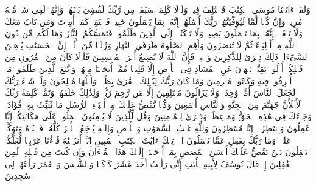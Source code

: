 \stopbuffer
\startbuffer[\q:11:110]
وَلَقَدۡ ءَاتَیۡنَا مُوسَى ٱلۡكِتَٰبَ فَٱخۡتُلِفَ فِیهِۚ وَلَوۡلَا كَلِمَةࣱ سَبَقَتۡ مِن رَّبِّكَ لَقُضِیَ بَیۡنَهُمۡۚ وَإِنَّهُمۡ لَفِی شَكࣲّ مِّنۡهُ مُرِیبࣲ%
\stopbuffer
\startbuffer[\q:11:111]
وَإِنَّ كُلࣰّا لَّمَّا لَیُوَفِّیَنَّهُمۡ رَبُّكَ أَعۡمَٰلَهُمۡۚ إِنَّهُۥ بِمَا یَعۡمَلُونَ خَبِیرࣱ%
\stopbuffer
\startbuffer[\q:11:112]
فَٱسۡتَقِمۡ كَمَاۤ أُمِرۡتَ وَمَن تَابَ مَعَكَ وَلَا تَطۡغَوۡا۟ۚ إِنَّهُۥ بِمَا تَعۡمَلُونَ بَصِیرࣱ%
\stopbuffer
\startbuffer[\q:11:113]
وَلَا تَرۡكَنُوۤا۟ إِلَى ٱلَّذِینَ ظَلَمُوا۟ فَتَمَسَّكُمُ ٱلنَّارُ وَمَا لَكُم مِّن دُونِ ٱللَّهِ مِنۡ أَوۡلِیَاۤءَ ثُمَّ لَا تُنصَرُونَ%
\stopbuffer
\startbuffer[\q:11:114]
وَأَقِمِ ٱلصَّلَوٰةَ طَرَفَیِ ٱلنَّهَارِ وَزُلَفࣰا مِّنَ ٱلَّیۡلِۚ إِنَّ ٱلۡحَسَنَٰتِ یُذۡهِبۡنَ ٱلسَّیِّءَاتِۚ ذَٰلِكَ ذِكۡرَىٰ لِلذَّٰكِرِینَ%
\stopbuffer
\startbuffer[\q:11:115]
وَٱصۡبِرۡ فَإِنَّ ٱللَّهَ لَا یُضِیعُ أَجۡرَ ٱلۡمُحۡسِنِینَ%
\stopbuffer
\startbuffer[\q:11:116]
فَلَوۡلَا كَانَ مِنَ ٱلۡقُرُونِ مِن قَبۡلِكُمۡ أُو۟لُوا۟ بَقِیَّةࣲ یَنۡهَوۡنَ عَنِ ٱلۡفَسَادِ فِی ٱلۡأَرۡضِ إِلَّا قَلِیلࣰا مِّمَّنۡ أَنجَیۡنَا مِنۡهُمۡۗ وَٱتَّبَعَ ٱلَّذِینَ ظَلَمُوا۟ مَاۤ أُتۡرِفُوا۟ فِیهِ وَكَانُوا۟ مُجۡرِمِینَ%
\stopbuffer
\startbuffer[\q:11:117]
وَمَا كَانَ رَبُّكَ لِیُهۡلِكَ ٱلۡقُرَىٰ بِظُلۡمࣲ وَأَهۡلُهَا مُصۡلِحُونَ%
\stopbuffer
\startbuffer[\q:11:118]
وَلَوۡ شَاۤءَ رَبُّكَ لَجَعَلَ ٱلنَّاسَ أُمَّةࣰ وَٰحِدَةࣰۖ وَلَا یَزَالُونَ مُخۡتَلِفِینَ%
\stopbuffer
\startbuffer[\q:11:119]
إِلَّا مَن رَّحِمَ رَبُّكَۚ وَلِذَٰلِكَ خَلَقَهُمۡۗ وَتَمَّتۡ كَلِمَةُ رَبِّكَ لَأَمۡلَأَنَّ جَهَنَّمَ مِنَ ٱلۡجِنَّةِ وَٱلنَّاسِ أَجۡمَعِینَ%
\stopbuffer
\startbuffer[\q:11:120]
وَكُلࣰّا نَّقُصُّ عَلَیۡكَ مِنۡ أَنۢبَاۤءِ ٱلرُّسُلِ مَا نُثَبِّتُ بِهِۦ فُؤَادَكَۚ وَجَاۤءَكَ فِی هَٰذِهِ ٱلۡحَقُّ وَمَوۡعِظَةࣱ وَذِكۡرَىٰ لِلۡمُؤۡمِنِینَ%
\stopbuffer
\startbuffer[\q:11:121]
وَقُل لِّلَّذِینَ لَا یُؤۡمِنُونَ ٱعۡمَلُوا۟ عَلَىٰ مَكَانَتِكُمۡ إِنَّا عَٰمِلُونَ%
\stopbuffer
\startbuffer[\q:11:122]
وَٱنتَظِرُوۤا۟ إِنَّا مُنتَظِرُونَ%
\stopbuffer
\startbuffer[\q:11:123]
وَلِلَّهِ غَیۡبُ ٱلسَّمَٰوَٰتِ وَٱلۡأَرۡضِ وَإِلَیۡهِ یُرۡجَعُ ٱلۡأَمۡرُ كُلُّهُۥ فَٱعۡبُدۡهُ وَتَوَكَّلۡ عَلَیۡهِۚ وَمَا رَبُّكَ بِغَٰفِلٍ عَمَّا تَعۡمَلُونَ%
\stopbuffer
\startbuffer[\q:12:1]
الۤرۚ تِلۡكَ ءَایَٰتُ ٱلۡكِتَٰبِ ٱلۡمُبِینِ%
\stopbuffer
\startbuffer[\q:12:2]
إِنَّاۤ أَنزَلۡنَٰهُ قُرۡءَٰنًا عَرَبِیࣰّا لَّعَلَّكُمۡ تَعۡقِلُونَ%
\stopbuffer
\startbuffer[\q:12:3]
نَحۡنُ نَقُصُّ عَلَیۡكَ أَحۡسَنَ ٱلۡقَصَصِ بِمَاۤ أَوۡحَیۡنَاۤ إِلَیۡكَ هَٰذَا ٱلۡقُرۡءَانَ وَإِن كُنتَ مِن قَبۡلِهِۦ لَمِنَ ٱلۡغَٰفِلِینَ%
\stopbuffer
\startbuffer[\q:12:4]
إِذۡ قَالَ یُوسُفُ لِأَبِیهِ یَٰۤأَبَتِ إِنِّی رَأَیۡتُ أَحَدَ عَشَرَ كَوۡكَبࣰا وَٱلشَّمۡسَ وَٱلۡقَمَرَ رَأَیۡتُهُمۡ لِی سَٰجِدِینَ%
\stopbuffer
